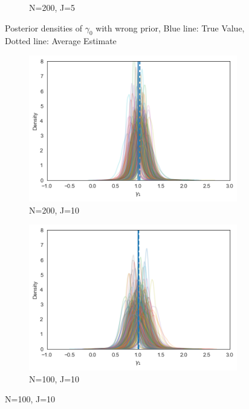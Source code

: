 \begin{figure}[H]
\begin{subfigure}[b]{0.3\linewidth}
    \caption{N=200, J=5}
  \end{subfigure}
  \caption{Posterior densities of $\gamma_0$ with wrong prior, Blue line: True Value, Dotted line: Average Estimate}
  \label{fig:posterior_wrong_gamma0}
\end{figure}


\begin{figure}[H]
  \centering
  \begin{subfigure}[b]{0.3\linewidth}
    \includegraphics[width=\linewidth]{graphics/posterior_plot_gamma1_wrong}
    \caption{ N=200, J=10}
  \end{subfigure}
  \begin{subfigure}[b]{0.3\linewidth}
    \includegraphics[width=\linewidth]{graphics/posterior_plot_gamma1_wrong_smallN}
    \caption{ N=100, J=10}
  \end{subfigure}

\end{figure}
